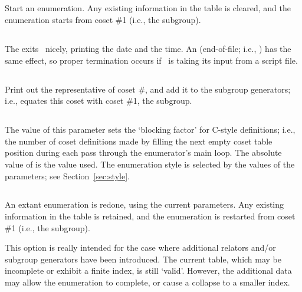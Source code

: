 \subsection{}

Start an enumeration.
Any existing information in the table is cleared, and the enumeration
  starts from coset \#1 (i.e., the subgroup).

\subsection{}

The exits \ace\ nicely, printing the date and the time.
An  (end-of-file; i.e., ) has the same effect, so 
  proper termination occurs if \ace\ is taking its input from a script
  file.

\subsection{}

Print out the representative of coset \#, and add it to the
  subgroup generators; i.e., equates this coset with coset \#1, the
  subgroup.

\subsection{}

The value of this parameter sets the `blocking factor' for C-style
  definitions; i.e., the number of coset definitions made by filling the
  next empty coset table position during each pass through the enumerator's
  main loop.
The absolute value of  is the value used.
The enumeration style is selected by the values of the  \amp
   parameters; see Section~\ref{sec:style}.

\subsection{}

An extant enumeration is redone, using the current parameters.
Any existing information in the table is retained, and the enumeration
  is restarted from coset \#1 (i.e., the subgroup).

This option is really intended for the case where additional relators
  and/or subgroup generators have been introduced.
The current table, which may be incomplete or exhibit a finite index, is
  still `valid'\kern-1.5pt.
However, the additional data may allow the enumeration to complete, or
  cause a collapse to a smaller index.

